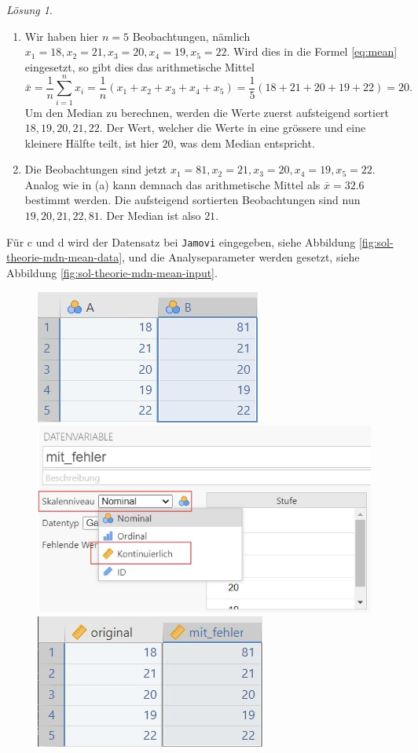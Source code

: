 \documentclass[
]{book}
\providecommand{\tightlist}{%
  \setlength{\itemsep}{0pt}\setlength{\parskip}{0pt}}
\theoremstyle{definition}
\theoremstyle{definition}
\theoremstyle{definition}
\theoremstyle{definition}
\theoremstyle{remark}
\newtheorem*{solution}{Lösung}
\begin{document}
\begin{solution}
\leavevmode

\begin{enumerate}
\def\labelenumi{(\alph{enumi})}
\tightlist
\item
  Wir haben hier \(n=5\) Beobachtungen, nämlich \(x_1 = 18, x_2 = 21, x_3 = 20, x_4 = 19, x_5=22\). Wird dies in die Formel \eqref{eq:mean} eingesetzt, so gibt dies das arithmetische Mittel
  \[\bar{x} = \frac{1}{n}\sum^n_{i=1} x_i = \frac{1}{n}(x_1 + x_2 + x_3 + x_4 + x_5) =  \frac{1}{5}(18+ 21+ 20+ 19+ 22) = 20.\]
  Um den Median zu berechnen, werden die Werte zuerst aufsteigend sortiert \(18, 19, 20, 21, 22\). Der Wert, welcher die Werte in eine grössere und eine kleinere Hälfte teilt, ist hier \(20\), was dem Median entspricht.
\item
  Die Beobachtungen sind jetzt \(x_1 = 81, x_2 = 21, x_3 = 20, x_4 = 19, x_5=22\). Analog wie in (a) kann demnach das arithmetische Mittel als \(\bar{x} = 32.6\) bestimmt werden. Die aufsteigend sortierten Beobachtungen sind nun \(19, 20, 21, 22, 81\). Der Median ist also \(21\).
\end{enumerate}

Für c und d wird der Datensatz bei \texttt{Jamovi} eingegeben, siehe Abbildung \ref{fig:sol-theorie-mdn-mean-data}, und die Analyseparameter werden gesetzt, siehe Abbildung \ref{fig:sol-theorie-mdn-mean-input}.

\begin{figure}

{\centering \includegraphics[width=0.33\linewidth]{figures/02-exr-theorie-mdn-mean-data-input} \includegraphics[width=0.33\linewidth]{figures/02-exr-theorie-mdn-mean-data-mod} \includegraphics[width=0.33\linewidth]{figures/02-exr-theorie-mdn-mean-data-clean} 

}
\end{figure}
\end{solution}
\end{document}

